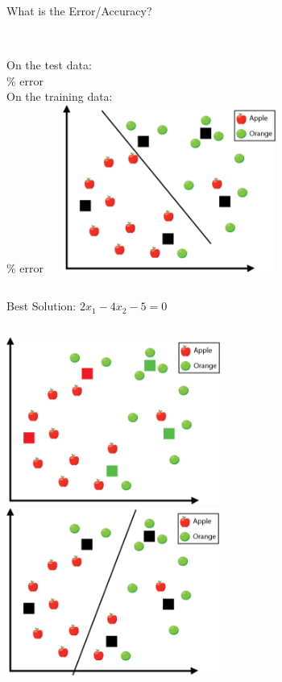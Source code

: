 \documentclass[aspectratio=169, 14pt,usenames,dvipsnames]{beamer}
\begin{document}
\begin{frame}{What is the Error/Accuracy?}
\begin{columns}
\\
	\centering On the test data: \\ \% error \\[8pt]
On the training data: \\ \% error
\includegraphics[width=8cm,height=5.5cm]{Images/6lcla.png}
\end{columns}
\end{frame}


\begin{frame}{Best Solution: $2x_1 - 4x_2 - 5 = 0$}
\begin{columns}
\includegraphics[width=7cm,height=5.5cm]{Images/7lcla.png}
\includegraphics[width=7cm,height=5.5cm]{Images/7alcla.png}
\end{columns}
\end{frame}
\end{document}
